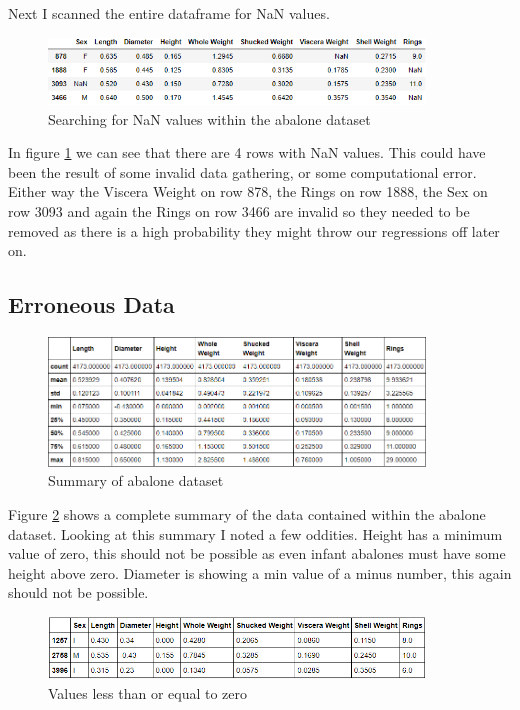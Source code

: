 Next I scanned the entire dataframe for NaN values.

\begin{figure}[H]
  \centering
  \includegraphics[scale=0.5,width=100mm]{./images/abalone-nan.png}
  \caption{Searching for NaN values within the abalone dataset}
  \label{fig:abalones-nan}
\end{figure}

In figure \ref{fig:abalones-nan} we can see that there are 4 rows with NaN values. This could have been the result of some invalid data gathering, or some computational error. Either way the Viscera Weight on row 878, the Rings on row 1888, the Sex on row 3093 and again the Rings on row 3466 are invalid so they needed to be removed as there is a high probability they might throw our regressions off later on.

\subsection{Erroneous Data}

\begin{figure}[H]
  \centering
  \includegraphics[scale=0.5,width=100mm]{./images/abalone-df-describe.png}
  \caption{Summary of abalone dataset}
  \label{fig:abalones-df-describe}
\end{figure}

Figure \ref{fig:abalones-df-describe} shows a complete summary of the data contained within the abalone dataset. Looking at this summary I noted a few oddities. Height has a minimum value of zero, this should not be possible as even infant abalones must have some height above zero. Diameter is showing a min value of a minus number, this again should not be possible.

\begin{figure}[H]
  \centering
  \includegraphics[scale=0.5,width=100mm]{./images/abalone-less-than-zero.png}
  \caption{Values less than or equal to zero}
  \label{fig:abalones-less-than-zero}
\end{figure}

